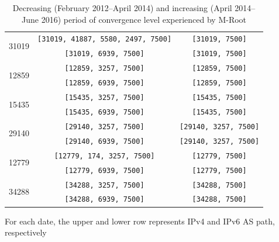 \begin{table}[!ht]
\begin{tabular}{c c c}
		\multirow{2}{*}{31019} & \texttt{\footnotesize [31019, 41887, 5580, 2497, 7500]}  & \texttt{\footnotesize [31019, 7500]} \\
		& \texttt{\footnotesize [31019, 6939, 7500]}  & \texttt{\footnotesize [31019, 7500]} \\ \hline
		
		\multirow{2}{*}{12859} & \texttt{\footnotesize [12859, 3257, 7500]}  & \texttt{\footnotesize [12859, 7500]} \\
		& \texttt{\footnotesize [12859, 6939, 7500]}  & \texttt{\footnotesize [12859, 7500]} \\ \hline
		
		\multirow{2}{*}{15435} & \texttt{\footnotesize [15435, 3257, 7500]}  & \texttt{\footnotesize [15435, 7500]} \\
		& \texttt{\footnotesize [15435, 6939, 7500]}  & \texttt{\footnotesize [15435, 7500]} \\ \hline
		
		\multirow{2}{*}{29140} & \texttt{\footnotesize [29140, 3257, 7500]}  & \texttt{\footnotesize [29140, 3257, 7500]} \\
		& \texttt{\footnotesize [29140, 6939, 7500]}  & \texttt{\footnotesize [29140, 3257, 7500]} \\ \hline
		
		\multirow{2}{*}{12779} & \texttt{\footnotesize [12779, 174, 3257, 7500]}  & \texttt{\footnotesize [12779, 7500]} \\
		& \texttt{\footnotesize [12779, 6939, 7500]}  & \texttt{\footnotesize [12779, 7500]} \\ \hline
		
		\multirow{2}{*}{34288} & \texttt{\footnotesize [34288, 3257, 7500]}  & \texttt{\footnotesize [34288, 7500]} \\
		& \texttt{\footnotesize [34288, 6939, 7500]}  & \texttt{\footnotesize [34288, 7500]} \\ \hline				
	\end{tabular}
	\begin{tablenotes}
		\item For each date, the upper and lower row represents IPv4 and IPv6 AS path, respectively
	\end{tablenotes}
	\caption{Decreasing (February 2012--April 2014) and increasing (April 2014--June 2016) period of convergence level experienced by M-Root}
	\label{table:ch04:convergence:m-root-analysis}
\end{table}

